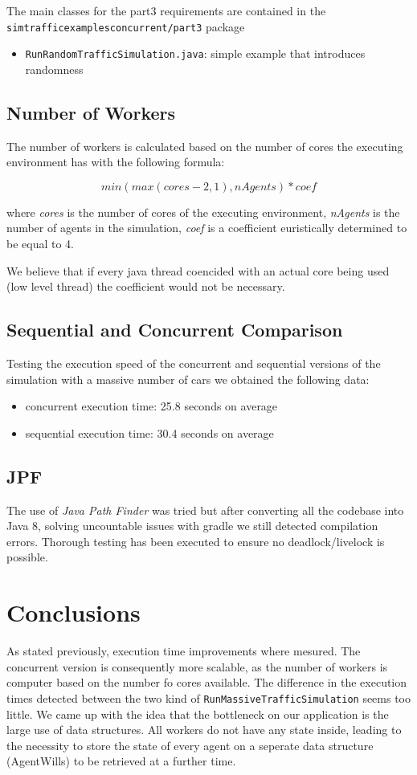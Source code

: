 \documentclass[12pt, a4paper]{report}
\begin{document}
The main classes for the part3 requirements are contained in the\\ \texttt{simtrafficexamplesconcurrent/part3} package
\begin{itemize}
    \item \texttt{RunRandomTrafficSimulation.java}: simple example that introduces randomness
\end{itemize}

\section{Number of Workers}
The number of workers  is calculated based on the number of cores the executing environment has with the following
 formula:

\[min(max(cores - 2, 1), nAgents) * coef\]

where \emph{cores} is the number of cores of the executing environment, \emph{nAgents} is the number of agents in the simulation,
 \emph{coef} is a coefficient euristically determined to be equal to 4.

We believe that if every java thread coencided with an actual core being used (low level thread) the coefficient
 would not be necessary. 

\section{Sequential and Concurrent Comparison}
Testing the execution speed of the concurrent and sequential versions of the simulation with a massive number of cars
 we obtained the following data:
\begin{itemize}
    \item concurrent execution time: 25.8 seconds on average
    \item sequential execution time: 30.4 seconds on average
\end{itemize}

\section{JPF}
The use of \emph{Java Path Finder} was tried but after converting all the codebase into Java 8, solving uncountable issues with gradle we still detected compilation errors.
Thorough testing has been executed to ensure no deadlock/livelock is possible.

\chapter{Conclusions}
As stated previously, execution time improvements where mesured. The concurrent version is consequently more scalable, as the number of workers is computer based on the number fo cores available. The difference in the execution times detected between the two kind of \texttt{RunMassiveTrafficSimulation} seems too little. We came up with the idea that the bottleneck on our application is the large use of data structures. All workers do not have any state inside, leading to the necessity to store the state of every agent on a seperate data structure (AgentWills) to be retrieved at a further time.



\end{document}
